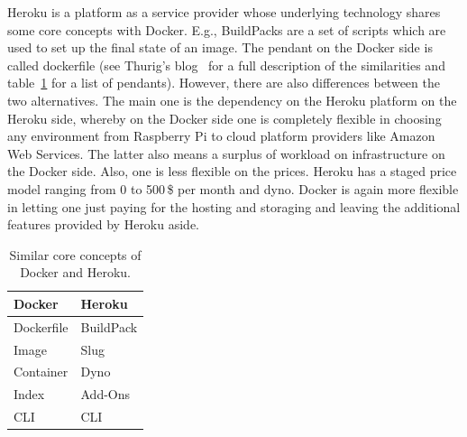 Heroku is a platform as a service provider whose underlying technology shares some core concepts with Docker. E.g., BuildPacks are a set of scripts which are used to set up the final state of an image. The pendant on the Docker side is called dockerfile (see Thurig's blog~\cite{Thurig2014Docker2018} for a full description of the similarities and table~\ref{dockerandheroku} for a list of pendants). However, there are also differences between the two alternatives. The main one is the dependency on the Heroku platform on the Heroku side, whereby on the Docker side one is completely flexible in choosing any environment from Raspberry Pi to cloud platform providers like Amazon Web Services. The latter also means a surplus of workload on infrastructure on the Docker side. Also, one is less flexible on the prices. Heroku has a staged price model ranging from 0 to 500\,\$ per month and dyno. Docker is again more flexible in letting one just paying for the hosting and storaging and leaving the additional features provided by Heroku aside.~\cite{Chris2017Why2018} 


\begin{table}
\begin{center}
      \caption[Similar core concepts of Docker and Heroku]{Similar core concepts of Docker and Heroku. \cite{Thurig2014Docker2018}}
  \begin{tabular}{ l | l }
    Docker & Heroku  \\ \hline
Dockerfile &	BuildPack \\ 
Image	& Slug\\ 
Container&	Dyno\\ 
Index	&Add-Ons\\ 
CLI	&CLI
  \end{tabular}
  \label{dockerandheroku}
\end{center}
\end{table}

